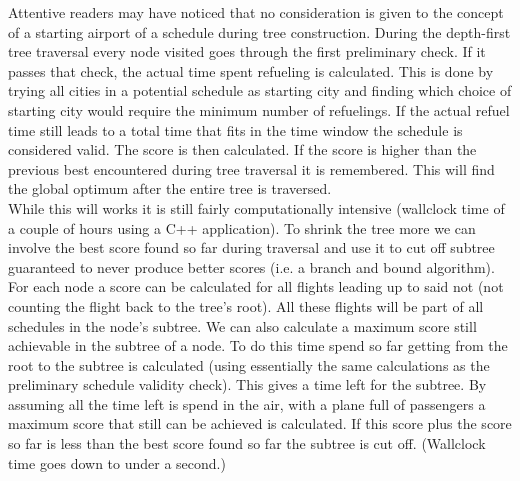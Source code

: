 \documentclass[journal]{IEEEtran}
\begin{document}
Attentive readers may have noticed that no consideration is given to the concept of a starting airport of a schedule during tree construction. During the depth-first tree traversal every node visited goes through the first preliminary check. If it passes that check, the actual time spent refueling is calculated. This is done by trying all cities in a potential schedule as starting city and finding which choice of starting city would require the minimum number of refuelings. If the actual refuel time still leads to a total time that fits in the time window the schedule is considered valid. The score is then calculated. If the score is higher than the previous best encountered during tree traversal it is remembered. This will find the global optimum after the entire tree is traversed.\\
While this will works it is still fairly computationally intensive (wallclock time of a couple of hours using a C++ application). To shrink the tree more we can involve the best score found so far during traversal and use it to cut off subtree guaranteed to never produce better scores (i.e. a branch and bound algorithm). For each node a score can be calculated for all flights leading up to said not (not counting the flight back to the tree's root). All these flights will be part of all schedules in the node's subtree. We can also calculate a maximum score still achievable in the subtree of a node. To do this time spend so far getting from the root to the subtree is calculated (using essentially the same calculations as the preliminary schedule validity check). This gives a time left for the subtree. By assuming all the time left is spend in the air, with a plane full of passengers a maximum score that still can be achieved is calculated. If this score plus the score so far is less than the best score found so far the subtree is cut off. (Wallclock time goes down to under a second.)
\end{document}
